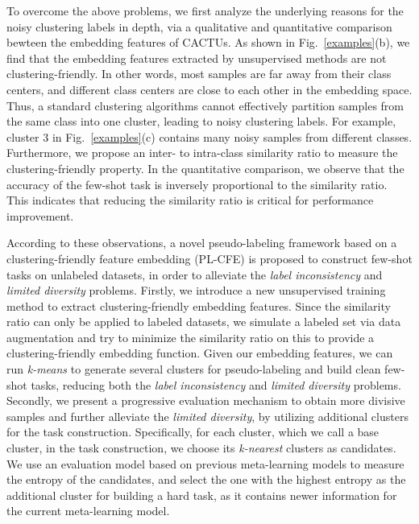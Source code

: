 \documentclass[runningheads]{llncs}
\def\ourmodel{PL-CFE}
\begin{document}
To overcome the above problems, we first analyze the underlying reasons for the noisy clustering labels in depth, via a qualitative and quantitative comparison bewteen the embedding features of CACTUs. 
As shown in Fig.~\ref{examples}(b), we find that the embedding features extracted by unsupervised methods are not clustering-friendly. In other words, most samples are far away from their class centers, and different class centers are close to each other in the embedding space. Thus, a standard clustering algorithms cannot effectively partition samples from the same class into one cluster, leading to noisy clustering labels. For example, cluster 3 in Fig.~\ref{examples}(c) contains many noisy samples from different classes. Furthermore, we propose an inter- to intra-class similarity ratio to measure the clustering-friendly property. 
In the quantitative comparison, we observe that the accuracy of the few-shot task is inversely proportional to the similarity ratio. This indicates that reducing the similarity ratio is critical for performance improvement.

According to these observations, a novel pseudo-labeling framework based on a clustering-friendly feature embedding (\ourmodel) is proposed to construct few-shot tasks on unlabeled datasets, in order to alleviate the \textit{label inconsistency} and \textit{limited diversity} problems. Firstly, we introduce a new unsupervised training method to extract clustering-friendly embedding features. Since the similarity ratio can only be applied to labeled datasets, we simulate a labeled set via data augmentation and try to minimize the similarity ratio on this to provide a clustering-friendly embedding function. 
Given our embedding features, we can run \textit{k-means} to generate several clusters for pseudo-labeling and build clean few-shot tasks, reducing both the \textit{label inconsistency} and \textit{limited diversity} problems. Secondly, we present a progressive evaluation mechanism to obtain more divisive samples and further alleviate the \textit{limited diversity}, by utilizing additional clusters for the task construction. Specifically, for each cluster, which we call a base cluster, in the task construction, we choose its \textit{k-nearest} clusters as candidates. We use an evaluation model based on previous meta-learning models to measure the entropy of the candidates, and select the one with the highest entropy as the additional cluster for building a hard task, as it contains newer information for the current meta-learning model. 
\end{document}
